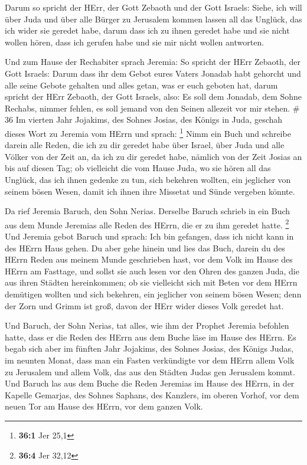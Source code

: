  Darum so spricht der HErr, der Gott Zebaoth und der Gott
Israels: Siehe, ich will über Juda und über alle Bürger zu Jerusalem
kommen lassen all das Unglück, das ich wider sie geredet habe, darum
dass ich zu ihnen geredet habe und sie nicht wollen hören, dass ich
gerufen habe und sie mir nicht wollen antworten.

 Und zum Hause der Rechabiter sprach Jeremia: So spricht
der HErr Zebaoth, der Gott Israels: Darum dass ihr dem Gebot eures
Vaters Jonadab habt gehorcht und alle seine Gebote gehalten und alles
getan, was er euch geboten hat,  darum spricht der HErr
Zebaoth, der Gott Israels, also: Es soll dem Jonadab, dem Sohne Rechabs,
nimmer fehlen, es soll jemand von den Seinen allezeit vor mir stehen. \#
36  Im vierten Jahr Jojakims, des Sohnes Josias, des Königs
in Juda, geschah dieses Wort zu Jeremia vom HErrn und sprach:
\footnote{\textbf{36:1} Jer 25,1}  Nimm ein Buch und
schreibe darein alle Reden, die ich zu dir geredet habe über Israel,
über Juda und alle Völker von der Zeit an, da ich zu dir geredet habe,
nämlich von der Zeit Josias an bis auf diesen Tag;  ob
vielleicht die vom Hause Juda, wo sie hören all das Unglück, das ich
ihnen gedenke zu tun, sich bekehren wollten, ein jeglicher von seinem
bösen Wesen, damit ich ihnen ihre Missetat und Sünde vergeben könnte.

 Da rief Jeremia Baruch, den Sohn Nerias. Derselbe Baruch
schrieb in ein Buch aus dem Munde Jeremias alle Reden des HErrn, die er
zu ihm geredet hatte. \footnote{\textbf{36:4} Jer 32,12} 
Und Jeremia gebot Baruch und sprach: Ich bin gefangen, dass ich nicht
kann in des HErrn Haus gehen.  Du aber gehe hinein und lies
das Buch, darein du des HErrn Reden aus meinem Munde geschrieben hast,
vor dem Volk im Hause des HErrn am Fasttage, und sollst sie auch lesen
vor den Ohren des ganzen Juda, die aus ihren Städten hereinkommen;
 ob sie vielleicht sich mit Beten vor dem HErrn demütigen
wollten und sich bekehren, ein jeglicher von seinem bösen Wesen; denn
der Zorn und Grimm ist groß, davon der HErr wider dieses Volk geredet
hat.

 Und Baruch, der Sohn Nerias, tat alles, wie ihm der Prophet
Jeremia befohlen hatte, dass er die Reden des HErrn aus dem Buche läse
im Hause des HErrn.  Es begab sich aber im fünften Jahr
Jojakims, des Sohnes Josias, des Königs Judas, im neunten Monat, dass
man ein Fasten verkündigte vor dem HErrn allem Volk zu Jerusalem und
allem Volk, das aus den Städten Judas gen Jerusalem kommt. 
Und Baruch las aus dem Buche die Reden Jeremias im Hause des HErrn, in
der Kapelle Gemarjas, des Sohnes Saphans, des Kanzlers, im oberen
Vorhof, vor dem neuen Tor am Hause des HErrn, vor dem ganzen Volk.

